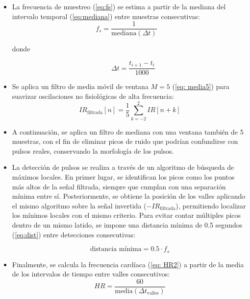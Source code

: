 \begin{itemize}
    \item La frecuencia de muestreo (\ref{eq:fs}) se estima a partir de la mediana del intervalo temporal (\ref{eq:mediana}) entre muestras consecutivas:
    \begin{equation}
        f_s = \frac{1}{\text{mediana}(\Delta t)} \quad
        \label{eq:fs}
    \end{equation}
    \begin{center}
        donde
    \end{center} \begin{equation}
        \quad \Delta t = \frac{t_{i+1} - t_i}{1000}
        \label{eq:mediana}
    \end{equation}
    \item Se aplica un filtro de media móvil de ventana \(M = 5\) (\ref{eq: media5}) para suavizar oscilaciones no fisiológicas de alta frecuencia:
    \begin{equation}
    IR_{\text{filtrada}}[n] = \frac{1}{5} \sum_{k=-2}^{2} IR[n+k]
    \label{eq: media5}
    \end{equation}
    \item A continuación, se aplica un filtro de mediana con una ventana también de 5 muestras, con el fin de eliminar picos de ruido que podrían confundirse con pulsos reales, conservando la morfología de los pulsos.
    \item La detección de pulsos se realiza a través de un algoritmo de búsqueda de máximos locales. En primer lugar, se identifican los picos como los puntos más altos de la señal filtrada, siempre que cumplan con una separación mínima entre sí. Posteriormente, se obtiene la posición de los valles aplicando el mismo algoritmo sobre la señal invertida (\(-IR_{\text{filtrada}}\)), permitiendo localizar los mínimos locales con el mismo criterio. Para evitar contar múltiples picos dentro de un mismo latido, se impone una distancia mínima de 0.5 segundos (\ref{eq:dist}) entre detecciones consecutivas:

    \begin{equation}
    \text{distancia mínima} = 0.5 \cdot f_s
    \label{eq:dist}
    \end{equation}
    \item Finalmente, se calcula la frecuencia cardíaca (\ref{eq: HR2}) a partir de la media de los intervalos de tiempo entre valles consecutivos:
    \begin{equation}
    HR = \frac{60}{\text{media}(\Delta t_{\text{valles}})}
    \label{eq: HR2}
    \end{equation}
\end{itemize}

